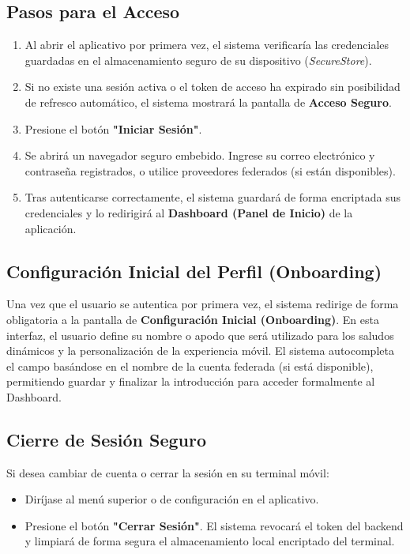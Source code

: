 \documentclass[11pt,a4paper]{article}
\begin{document}
\subsection{Pasos para el Acceso}
\begin{enumerate}
    \item Al abrir el aplicativo por primera vez, el sistema verificaría las credenciales guardadas en el almacenamiento seguro de su dispositivo (\textit{SecureStore}).
    \item Si no existe una sesión activa o el token de acceso ha expirado sin posibilidad de refresco automático, el sistema mostrará la pantalla de \textbf{Acceso Seguro}.
    \item Presione el botón \textbf{"Iniciar Sesión"}.
    \item Se abrirá un navegador seguro embebido. Ingrese su correo electrónico y contraseña registrados, o utilice proveedores federados (si están disponibles).
    \item Tras autenticarse correctamente, el sistema guardará de forma encriptada sus credenciales y lo redirigirá al \textbf{Dashboard (Panel de Inicio)} de la aplicación.
\end{enumerate}

\subsection{Configuración Inicial del Perfil (Onboarding)}
Una vez que el usuario se autentica por primera vez, el sistema redirige de forma obligatoria a la pantalla de \textbf{Configuración Inicial (Onboarding)}. En esta interfaz, el usuario define su nombre o apodo que será utilizado para los saludos dinámicos y la personalización de la experiencia móvil. El sistema autocompleta el campo basándose en el nombre de la cuenta federada (si está disponible), permitiendo guardar y finalizar la introducción para acceder formalmente al Dashboard.

\subsection{Cierre de Sesión Seguro}
Si desea cambiar de cuenta o cerrar la sesión en su terminal móvil:
\begin{itemize}
    \item Diríjase al menú superior o de configuración en el aplicativo.
    \item Presione el botón \textbf{"Cerrar Sesión"}. El sistema revocará el token del backend y limpiará de forma segura el almacenamiento local encriptado del terminal.
\end{itemize}
\end{document}

